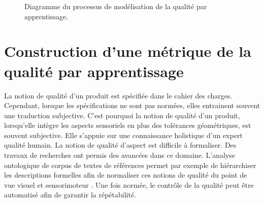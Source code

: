 \begin{figure}[hbtp]
    \caption{Diagramme du processus de modélisation de la qualité par apprentissage.}
    \label{fig:deep_flowchart}
\end{figure}

\vfill
\newpage

\section{Construction d'une métrique de la qualité par apprentissage} \label{sec:metric_learning}
La notion de qualité d'un produit est spécifiée dans le cahier des charges.
Cependant, lorsque les spécifications ne sont pas normées, elles entrainent souvent une traduction subjective.
C'est pourquoi la notion de qualité d'un produit, lorsqu'elle intègre les aspects sensoriels en plus des tolérances géométriques, est souvent subjective.
Elle s'appuie sur une connaissance holistique d'un expert qualité humain. La notion de qualité d'aspect est difficile à formaliser.
Des travaux de recherches ont permis des avancées dans ce domaine.
L'analyse ontologique de corpus de textes de références permet par exemple de hiérarchiser les descriptions formelles afin de normaliser ces notions de qualité du point de vue visuel \cite{baudet_maitrise_2012} et sensorimoteur \cite{albert_smart_2017}.
Une fois normée, le contrôle de la qualité peut être automatisé \cite{desage_contraintes_2015, pitard_metrologie_2016, lacombe_exploitation_2018a, albert_maitrise_2019} afin de garantir la répétabilité.

